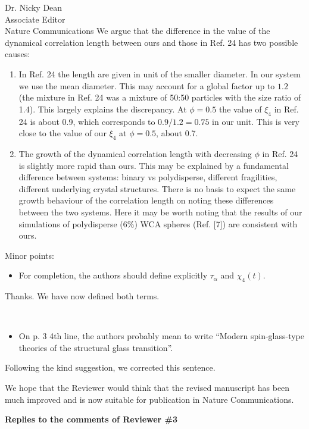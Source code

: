 \documentclass[a4paper, rebuttal, parskip=true, firsthead=false, fromemail=true, foldmarks=false]{scrlttr2}
\begin{document}
\begin{letter}{Dr. Nicky Dean\\
Associate Editor\\
Nature Communications}
We argue that the difference in the value of the dynamical correlation length between ours and those in Ref. 24 has two possible causes:
\begin{enumerate}
\item In Ref. 24 the length are given in unit of the smaller diameter. In our system we use the mean diameter. This may account for a global factor up to $1.2$ (the mixture in Ref. 24 was a mixture of 50:50 particles with the size ratio of 1.4). This largely explains the discrepancy. At $\phi=0.5$ the value of $\xi_4$ in Ref. 24 is about 0.9, 
which corresponds to $0.9/1.2=0.75$ in our unit. This is very close to the value of our $\xi_4$ at $\phi=0.5$, about 0.7.   
\item The growth of the dynamical correlation length with decreasing $\phi$ in Ref. 24 is slightly more rapid than ours. 
This may be explained by a fundamental difference between systems: binary vs polydisperse, different fragilities, different underlying crystal structures. 
There is no basis to expect the same growth behaviour of the correlation length on noting these differences between the two systems. 
Here it may be worth noting that the results of our simulations of polydisperse ($6\%$) WCA spheres (Ref. [7]) are consistent with ours. 
\end{enumerate} 


\begin{quotationi}
Minor points:
\begin{itemize}
\item For completion, the authors should define explicitly $\tau_\alpha$ and $\chi_4(t)$.
\end{itemize}
\end{quotationi}
Thanks. We have now defined both terms.

\begin{quotationi}
~
\begin{itemize}
\item On p. 3 4th line, the authors probably mean to write ``Modern spin-glass-type theories of the structural glass transition''.
\end{itemize}
\end{quotationi}
Following the kind suggestion, we corrected this sentence.

We hope that the Reviewer would think that the revised manuscript has been much improved and is now suitable for publication in Nature Communications. 
 
\clearpage

\textsf{\textbf{Replies to the comments of Reviewer \#3}}


\end{letter}
\end{document}
